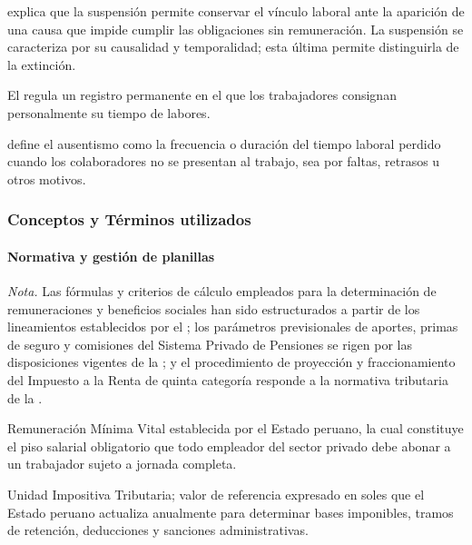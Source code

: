  \textcite[2]{delossantos2024suspension} explica que la suspensión permite conservar el vínculo laboral 
ante la aparición de una causa que impide cumplir las obligaciones sin remuneración. La suspensión se caracteriza por su causalidad y temporalidad; esta última permite distinguirla de la extinción.

 El \textcite[art.~1]{ds0042006} regula un registro permanente en el que los trabajadores 
consignan personalmente su tiempo de labores.

 \textcite[90]{chiavenato2009talento} define el ausentismo como la frecuencia o duración del tiempo laboral perdido cuando los colaboradores 
no se presentan al trabajo, sea por faltas, retrasos u otros motivos.
\par
\endgroup

\subsubsection{Conceptos y Términos utilizados}

\paragraph{Normativa y gestión de planillas}

\noindent\textit{Nota.} Las fórmulas y criterios de cálculo empleados para la determinación de remuneraciones y 
beneficios sociales han sido estructurados a partir de los lineamientos establecidos por el \textcite{mtpe2026calculo}; 
los parámetros previsionales de aportes, primas de seguro y comisiones del Sistema Privado de Pensiones 
se rigen por las disposiciones vigentes de la \textcite{sbs2026afp}; y el procedimiento de proyección y 
fraccionamiento del Impuesto a la Renta de quinta categoría responde a la normativa tributaria de la \textcite{sunat2026quinta}.

Remuneración Mínima Vital establecida por el Estado peruano, la cual constituye el piso salarial 
obligatorio que todo empleador del sector privado debe abonar a un trabajador sujeto a jornada completa.

Unidad Impositiva Tributaria; valor de referencia expresado en soles que el Estado peruano 
actualiza anualmente para determinar bases imponibles, tramos de retención, deducciones y sanciones administrativas.

